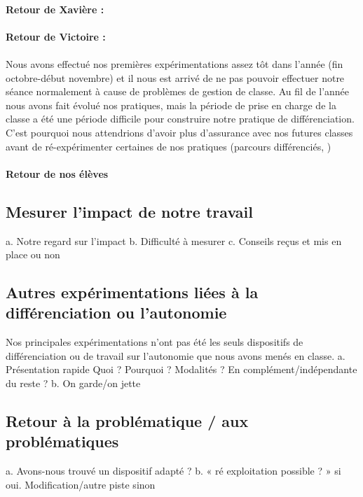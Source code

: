 \paragraph*{Retour de Xavière :}

\paragraph*{Retour de Victoire :}

\paragraph*{}
Nous avons effectué nos premières expérimentations assez tôt dans l'année (fin octobre-début novembre) et il nous est arrivé de ne pas pouvoir effectuer notre séance normalement à cause de problèmes de gestion de classe. Au fil de l'année nous avons fait évolué nos pratiques, mais la période de prise en charge de la classe a été une période difficile pour construire notre pratique de différenciation. C'est pourquoi nous  attendrions d'avoir plus d'assurance  avec nos futures classes avant de ré-expérimenter certaines de nos pratiques (parcours différenciés, )
\paragraph*{Retour de nos élèves}
\subsection{Mesurer l’impact de notre travail}
a.	Notre regard sur l’impact
b.	Difficulté à mesurer
c.	Conseils reçus et mis en place ou non
\subsection{Autres expérimentations liées à la différenciation ou l’autonomie}
Nos principales expérimentations n'ont pas été les seuls dispositifs de différenciation ou de travail sur l'autonomie que nous avons menés en classe.
a.	Présentation rapide
Quoi ? Pourquoi ? Modalités ? En complément/indépendante du reste ?
b.	On garde/on jette
\subsection{Retour à la problématique / aux problématiques}
a.	Avons-nous trouvé un dispositif adapté ?
b.	« ré exploitation possible ? » si oui. Modification/autre piste sinon
